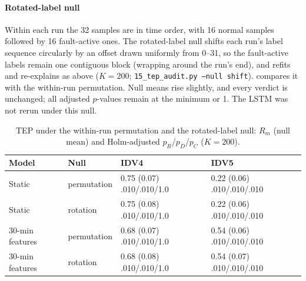 \documentclass[10pt]{article}
\begin{document}
\paragraph{Rotated-label null} Within each run the 32 samples are in time order, with 16 normal samples followed by 16 fault-active ones. The rotated-label null shifts each run's label sequence circularly by an offset drawn uniformly from 0--31, so the fault-active labels remain one contiguous block (wrapping around the run's end), and refits and re-explains as above ($K=200$; \texttt{15\_tep\_audit.py --null shift}).  compares it with the within-run permutation. Null means rise slightly, and every verdict is unchanged; all adjusted $p$-values remain at the minimum or 1. The LSTM was not rerun under this null.

\begin{table}[htbp]
\centering
\caption{TEP under the within-run permutation and the rotated-label null: $R_m$ (null mean) and Holm-adjusted $p_R$/$p_D$/$p_C$ ($K=200$).}
\label{tab:tepshift}
\small
\begin{tabular}{@{}llll@{}}
\toprule
Model & Null & IDV4 & IDV5 \\
\midrule
Static & permutation & 0.75 (0.07) .010/.010/1.0 & 0.22 (0.06) .010/.010/.010 \\
Static & rotation & 0.75 (0.08) .010/.010/1.0 & 0.22 (0.06) .010/.010/.010 \\
30-min features & permutation & 0.68 (0.07) .010/.010/1.0 & 0.54 (0.06) .010/.010/.010 \\
30-min features & rotation & 0.68 (0.08) .010/.010/1.0 & 0.54 (0.07) .010/.010/.010 \\
\bottomrule
\end{tabular}
\end{table}
\end{document}

